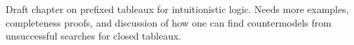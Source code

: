 \documentclass[../../../include/open-logic-chapter]{subfiles}
\begin{document}

\begin{editorial}
  Draft chapter on prefixed tableaux for intuitionistic logic. Needs more
  examples, completeness proofs, and discussion of how one can find
  countermodels from unsuccessful searches for closed tableaux.
\end{editorial}


\OLEndChapterHook
\end{document}

